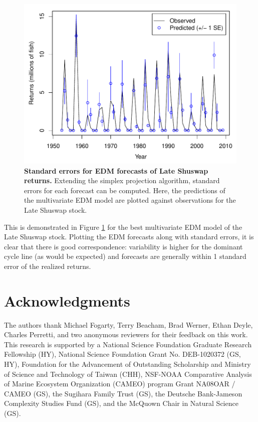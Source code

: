 \begin{figure}[!ht]
\begin{center}\includegraphics[width=\maxwidth{\textwidth}]{fig_salmon_s5.pdf}\end{center}
\caption[Standard errors for EDM forecasts of Late Shuswap returns.]{\textbf{Standard errors for EDM forecasts of Late Shuswap returns.}\newline
Extending the simplex projection algorithm, standard errors for each forecast can be computed. Here, the predictions of the multivariate EDM model are plotted against observations for the Late Shuswap stock.}
\label{fig_salmon_standard_error}
\end{figure}

This is demonstrated in Figure \ref{fig_salmon_standard_error} for the best multivariate EDM model of the Late Shuswap stock. Plotting the EDM forecasts along with standard errors, it is clear that there is good correspondence: variability is higher for the dominant cycle line (as would be expected) and forecasts are generally within 1 standard error of the realized returns.

\section{Acknowledgments}
The authors thank Michael Fogarty, Terry Beacham, Brad Werner, Ethan Deyle, Charles Perretti, and two anonymous reviewers for their feedback on this work. This research is supported by a National Science Foundation Graduate Research Fellowship (HY), National Science Foundation Grant No. DEB-1020372 (GS, HY), Foundation for the Advancement of Outstanding Scholarship and Ministry of Science and Technology of Taiwan (CHH), NSF-NOAA Comparative Analysis of Marine Ecosystem Organization (CAMEO) program Grant NA08OAR / CAMEO (GS), the Sugihara Family Trust (GS), the Deutsche Bank-Jameson Complexity Studies Fund (GS), and the McQuown Chair in Natural Science (GS).

